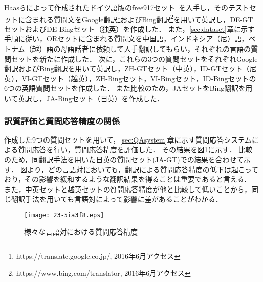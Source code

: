 \documentclass[japanese]{jnlp_1.4}
\begin{document}
{Haasらによって作成されたドイツ語版の{free917}セット~{\cite{haas2015}}を入手し，そのテストセットに含まれる質問文を{Google}翻訳{\footnote{https://translate.google.co.jp/, 2016年6月アクセス}}および{Bing}翻訳{\footnote{https://www.bing.com/translator, 2016年6月アクセス}}を用いて英訳し，{DE-GT}セットおよび{DE-Bing}セット（独英）を作成した．
また，{\ref{sec:dataset}}章に示す手順に従い，ORセットに含まれる質問文を中国語，インドネシア（尼）語，ベトナム（越）語の母語話者に依頼して人手翻訳してもらい，それぞれの言語の質問セットを新たに作成した．
次に，これらの3つの質問セットをそれぞれGoogle翻訳およびBing翻訳を用いて英訳し，ZH-GTセット（中英），ID-GTセット（尼英），VI-GTセット（越英），ZH-Bingセット，VI-Bingセット，ID-Bingセットの6つの英語質問セットを作成した．
また比較のため，JAセットをBing翻訳を用いて英訳し，JA-Bingセット（日英）を作成した．}


\subsubsection{{訳質評価と質問応答精度の関係}}

{作成した9つの質問セットを用いて，{\ref{sec:QAsystem}}章に示す質問応答システムによる質問応答を行い，質問応答精度を評価した．
その結果を図{\ref{fig:MltLngQAacc}}に示す．
比較のため，同翻訳手法を用いた日英の質問セット(JA-GT)での結果を合わせて示す．
図より，どの言語対においても，翻訳による質問応答精度の低下は起こっており，その影響を緩和するような翻訳結果を得ることは重要であると言える．
また，中英セットと越英セットの質問応答精度が他と比較して低いことから，同じ翻訳手法を用いても言語対によって影響に差があることがわかる．}

\begin{figure}[b]
\begin{center}
\texttt{[image: 23-5ia3f8.eps]}
\end{center}
\caption{{様々な言語対における質問応答精度}}
\label{fig:MltLngQAacc}
\end{figure}
\end{document}
